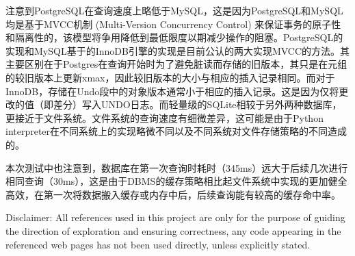 \documentclass[onecolumn, oneside, ctexart]{SUSTechHomework}
\begin{document}
\par 注意到PostgreSQL在查询速度上略低于MySQL，这是因为PostgreSQL和MySQL均是基于MVCC机制 (Multi-Version Concurrency Control) 来保证事务的原子性和隔离性的，该模型将争用降低到最低限度以期减少操作的阻塞。PostgreSQL的实现和MySQL基于的InnoDB引擎的实现是目前公认的两大实现MVCC的方法。其主要区别在于Postgres在查询开始时为了避免脏读而存储的旧版本，其只是在元组的较旧版本上更新xmax，因此较旧版本的大小与相应的插入记录相同。而对于InnoDB，存储在Undo段中的对象版本通常小于相应的插入记录。这是因为仅将更改的值（即差分）写入UNDO日志。\textsuperscript{\cite{blue-2020}}而轻量级的SQLite相较于另外两种数据库，更接近于文件系统。文件系统的查询速度有细微差异，这可能是由于Python interpreter在不同系统上的实现略微不同以及不同系统对文件存储策略的不同造成的。
\par 本次测试中也注意到，数据库在第一次查询时耗时（345ms）远大于后续几次进行相同查询（30ms），这是由于DBMS的缓存策略相比起文件系统中实现的更加健全高效，在第一次将数据搬入缓存或内存中后，后续查询能有较高的缓存命中率。

\vspace{2em}
\footnotesize



\noindent \scriptsize{Disclaimer: All references used in this project are only for the purpose of guiding the direction of exploration and ensuring correctness, any code appearing in the referenced web pages has not been used directly, unless explicitly stated.}
\end{document}
